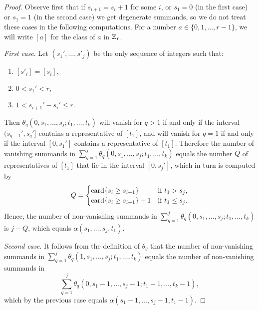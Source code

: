 \begin{proof}
	Observe first that if $s_{i+1} = s_i+1$ for some $i$, or $s_1 = 0$ (in the first case) or $s_1=1$ (in the second case) we get degenerate summands, so we do not treat these cases in the following computations.
	For a number $a\in \{0,1,\dots,r-1\}$, we will write $[a]$ for the class of $a$ in $\mathbb{Z}_{r}$.

	\vspace*{5pt}\noindent\textit{First case}.
	Let $(s_1',\dots,s'_j)$ be the only sequence of integers such that:
	\begin{enumerate}
		\item $[s'_i] = [s_i]$,
		\item $0< s_1'< r$,
		\item $1 < s_{i+1}' - s_i' \leq r$.
	\end{enumerate}
	Then $\theta_q(0,s_1,\dots,s_j;t_1,\dots,t_k)$ will vanish for $q>1$ if and only if the interval $(s_{q-1}',s_q']$ contains a representative of $[t_1]$, and will vanish for $q=1$ if and only if the interval $[0,s_1']$ contains a representative of $[t_1]$.
	Therefore the number of vanishing summands in $\sum_{q=1}^j\theta_q(0,s_1,\dots,s_j;t_1,\dots,t_k)$ equals the number $Q$ of representatives of $[t_1]$ that lie in the interval $[0,s_j']$, which in turn is computed by
	\[
	Q =
	\begin{cases}
		\operatorname{card}\{s_i \geq s_{i+1}\} & \text{if } t_1 > s_j, \\
		\operatorname{card}\{s_i \geq s_{i+1}\} + 1 & \text{if } t_1 \leq s_j.
	\end{cases}
	\]
	Hence, the number of non-vanishing summands in $\sum_{q=1}^j\theta_q(0,s_1,\dots,s_j;t_1,\dots,t_k)$ is $j-Q$, which equals $\alpha(s_1,\dots,s_j,t_1)$.

	\vspace*{5pt}\noindent\textit{Second case}.
	It follows from the definition of $\theta_q$ that the number of non-vanishing summands in $\sum_{q=1}^j \theta_q(1,s_1,\dots,s_j;t_1,\dots,t_k)$ equals the number of non-vanishing summands in
	\[
	\sum_{q=1}^j \theta_q(0,s_1-1,\dots,s_j-1;t_1-1,\dots,t_k-1),
	\]
	which by the previous case equals $\alpha(s_1-1,\dots,s_j-1,t_1-1)$.
\end{proof}